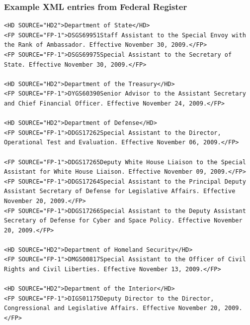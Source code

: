\documentclass{beamer}
\begin{document}
\begin{frame}[fragile]
\frametitle{Example XML entries from Federal Register}
\footnotesize
\begin{verbatim}
<HD SOURCE="HD2">Department of State</HD>
<FP SOURCE="FP-1">DSGS69951Staff Assistant to the Special Envoy with the Rank of Ambassador. Effective November 30, 2009.</FP>
<FP SOURCE="FP-1">DSGS69975Special Assistant to the Secretary of State. Effective November 30, 2009.</FP>

<HD SOURCE="HD2">Department of the Treasury</HD>
<FP SOURCE="FP-1">DYGS60390Senior Advisor to the Assistant Secretary and Chief Financial Officer. Effective November 24, 2009.</FP>

<HD SOURCE="HD2">Department of Defense</HD>
<FP SOURCE="FP-1">DDGS17262Special Assistant to the Director, Operational Test and Evaluation. Effective November 06, 2009.</FP>

<FP SOURCE="FP-1">DDGS17265Deputy White House Liaison to the Special Assistant for White House Liaison. Effective November 09, 2009.</FP>
<FP SOURCE="FP-1">DDGS17264Special Assistant to the Principal Deputy Assistant Secretary of Defense for Legislative Affairs. Effective November 20, 2009.</FP>
<FP SOURCE="FP-1">DDGS17266Special Assistant to the Deputy Assistant Secretary of Defense for Cyber and Space Policy. Effective November 20, 2009.</FP>

<HD SOURCE="HD2">Department of Homeland Security</HD>
<FP SOURCE="FP-1">DMGS00817Special Assistant to the Officer of Civil Rights and Civil Liberties. Effective November 13, 2009.</FP>

<HD SOURCE="HD2">Department of the Interior</HD>
<FP SOURCE="FP-1">DIGS01175Deputy Director to the Director, Congressional and Legislative Affairs. Effective November 20, 2009.</FP>
\end{verbatim}
\end{frame}
\end{document}
